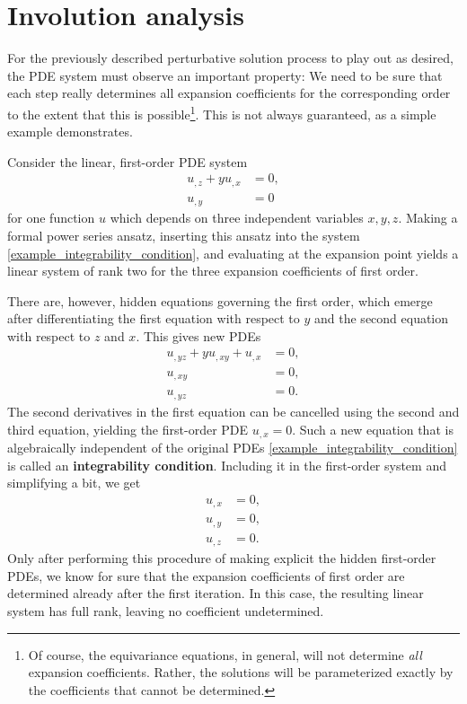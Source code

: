 \section{Involution analysis}
For the previously described perturbative solution process to play out as desired, the PDE system must observe an important property: We need to be sure that each step really determines all expansion coefficients for the corresponding order to the extent that this is possible\footnote{Of course, the equivariance equations, in general, will not determine \emph{all} expansion coefficients. Rather, the solutions will be parameterized exactly by the coefficients that cannot be determined.}. This is not always guaranteed, as a simple example demonstrates.
\begin{example}\label{example_involution_1}
  Consider the linear, first-order PDE system
  \begin{equation}\label{example_integrability_condition}
    \begin{aligned}
      u_{,z} + y u_{,x} &{} = 0, \\
      u_{,y} &{} = 0
    \end{aligned}
  \end{equation}
  for one function $u$ which depends on three independent variables $x,y,z$. Making a formal power series ansatz, inserting this ansatz into the system \eqref{example_integrability_condition}, and evaluating at the expansion point yields a linear system of rank two for the three expansion coefficients of first order.

  There are, however, hidden equations governing the first order, which emerge after differentiating the first equation with respect to $y$ and the second equation with respect to $z$ and $x$. This gives new PDEs
  \begin{equation}
    \begin{aligned}
      u_{,yz} + y u_{,xy} + u_{,x} &{} = 0, \\
      u_{,xy} &{} = 0, \\
      u_{,yz} &{} = 0.
    \end{aligned}
  \end{equation}
  The second derivatives in the first equation can be cancelled using the second and third equation, yielding the first-order PDE $u_{,x} = 0$. Such a new equation that is algebraically independent of the original PDEs \eqref{example_integrability_condition} is called an \textbf{integrability condition}. Including it in the first-order system and simplifying a bit, we get
  \begin{equation}
    \begin{aligned}
      u_{,x} &{} = 0, \\
      u_{,y} &{} = 0, \\
      u_{,z} &{} = 0.
    \end{aligned}
  \end{equation}
  Only after performing this procedure of making explicit the hidden first-order PDEs, we know for sure that the expansion coefficients of first order are determined already after the first iteration. In this case, the resulting linear system has full rank, leaving no coefficient undetermined.
\end{example}
